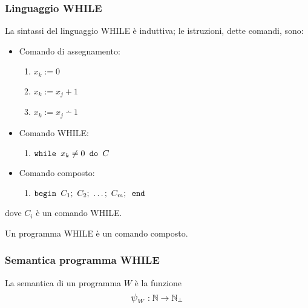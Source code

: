 \subsubsection*{Linguaggio WHILE}
La sintassi del linguaggio WHILE è induttiva; le istruzioni, dette comandi, sono:
\begin{itemize}
    \item Comando di assegnamento:
        \begin{enumerate}
            \item $x_k := 0$
            \item $x_k := x_j+1$
            \item $x_k := x_j\dotminus 1$
        \end{enumerate}
    \item Comando WHILE:
        \begin{enumerate}
            \item $ \texttt{while } x_k\neq0 \texttt{ do }  C$
        \end{enumerate}
    \item Comando composto:
        \begin{enumerate}
            \item $\textbegin C_ 1; \ C_2; \ \dots; \ C_m; \textend$
        \end{enumerate}
    \end{itemize}
dove $C_i$ è un comando WHILE.

Un programma WHILE è un comando composto.

\subsubsection*{Semantica programma WHILE}
La semantica di un programma $W$ è la funzione
    $$\semWHILE_W:\N\to\N_\perp$$
